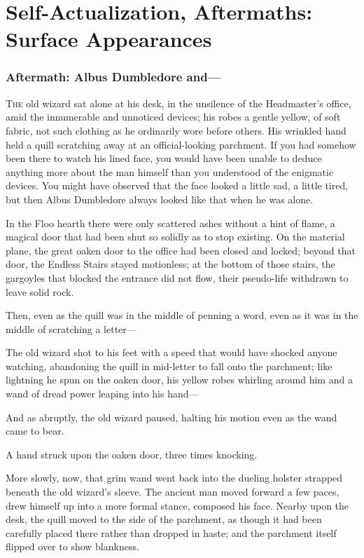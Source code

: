 \chapter{Self-Actualization, Aftermaths: Surface Appearances}

\subsection{Aftermath: Albus Dumbledore and---}

\lettrine{T}{he} old wizard sat alone at his desk, in the unsilence of the Headmaster's
office, amid the innumerable and unnoticed devices; his robes a gentle yellow,
of soft fabric, not such clothing as he ordinarily wore before others. His
wrinkled hand held a quill scratching away at an official-looking parchment. If
you had somehow been there to watch his lined face, you would have been unable
to deduce anything more about the man himself than you understood of the
enigmatic devices. You might have observed that the face looked a little sad, a
little tired, but then Albus Dumbledore always looked like that when he was
alone.

In the Floo hearth there were only scattered ashes without a hint of flame, a
magical door that had been shut so solidly as to stop existing. On the material
plane, the great oaken door to the office had been closed and locked; beyond
that door, the Endless Stairs stayed motionless; at the bottom of those stairs,
the gargoyles that blocked the entrance did not flow, their pseudo-life
withdrawn to leave solid rock.

Then, even as the quill was in the middle of penning a word, even as it was in
the middle of scratching a letter---

The old wizard shot to his feet with a speed that would have shocked anyone
watching, abandoning the quill in mid-letter to fall onto the parchment; like
lightning he spun on the oaken door, his yellow robes whirling around him and a
wand of dread power leaping into his hand---

And as abruptly, the old wizard paused, halting his motion even as the wand
came to bear.

A hand struck upon the oaken door, three times knocking.

More slowly, now, that grim wand went back into the dueling holster strapped
beneath the old wizard's sleeve. The ancient man moved forward a few paces,
drew himself up into a more formal stance, composed his face. Nearby upon the
desk, the quill moved to the side of the parchment, as though it had been
carefully placed there rather than dropped in haste; and the parchment itself
flipped over to show blankness.

